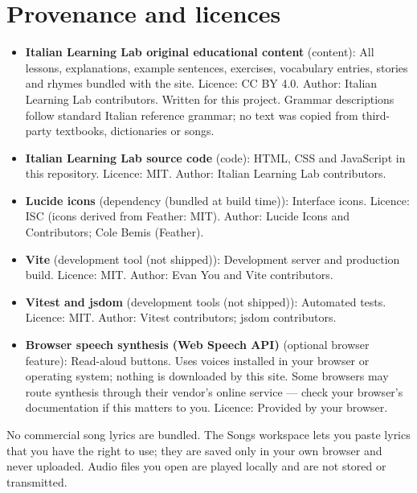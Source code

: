 \documentclass[11pt,a4paper,twoside,openright]{book}
\begin{document}
\section{Provenance and licences}
\begin{itemize}
\item\relax \textbf{Italian Learning Lab original educational content} (content): All lessons, explanations, example sentences, exercises, vocabulary entries, stories and rhymes bundled with the site. Licence: CC BY 4.0. Author: Italian Learning Lab contributors. Written for this project. Grammar descriptions follow standard Italian reference grammar; no text was copied from third-party textbooks, dictionaries or songs.
\item\relax \textbf{Italian Learning Lab source code} (code): HTML, CSS and JavaScript in this repository. Licence: MIT. Author: Italian Learning Lab contributors. 
\item\relax \textbf{Lucide icons} (dependency (bundled at build time)): Interface icons. Licence: ISC (icons derived from Feather: MIT). Author: Lucide Icons and Contributors; Cole Bemis (Feather). 
\item\relax \textbf{Vite} (development tool (not shipped)): Development server and production build. Licence: MIT. Author: Evan You and Vite contributors. 
\item\relax \textbf{Vitest and jsdom} (development tools (not shipped)): Automated tests. Licence: MIT. Author: Vitest contributors; jsdom contributors. 
\item\relax \textbf{Browser speech synthesis (Web Speech API)} (optional browser feature): Read-aloud buttons. Uses voices installed in your browser or operating system; nothing is downloaded by this site. Some browsers may route synthesis through their vendor's online service — check your browser's documentation if this matters to you. Licence: Provided by your browser.  
\end{itemize}
No commercial song lyrics are bundled. The Songs workspace lets you paste lyrics that you have the right to use; they are saved only in your own browser and never uploaded. Audio files you open are played locally and are not stored or transmitted.\par

\backmatter
\printindex
\end{document}
